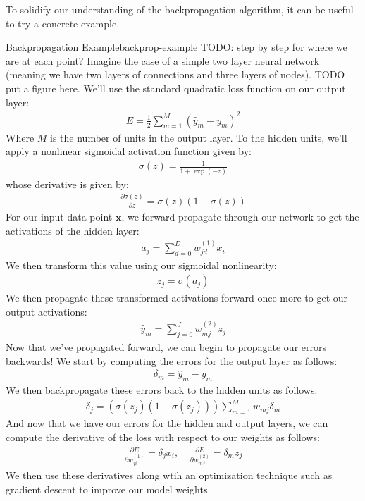 To solidify our understanding of the backpropagation algorithm, it can be useful to try a concrete example.

\begin{example}{Backpropagation Example}{backprop-example}
	TODO: step by step for where we are at each point?
	Imagine the case of a simple two layer neural network (meaning we have two layers of connections and three layers of nodes). TODO put a figure here. We'll use the standard quadratic loss function on our output layer:
	\begin{align*}
		E = \frac{1}{2} \sum_{m=1}^{M} (\hat{y}_{m} - y_{m})^{2}
	\end{align*}
	Where $M$ is the number of units in the output layer. To the hidden units, we'll apply a nonlinear sigmoidal activation function given by:
	\begin{align*}
		\sigma(z) = \frac{1}{1 + \exp{(-z)}}
	\end{align*}
	whose derivative is given by:
	\begin{align*}
		\frac{\partial \sigma(z)}{\partial z} = \sigma(z)(1 - \sigma(z))
	\end{align*}
	For our input data point $\textbf{x}$, we forward propagate through our network to get the activations of the hidden layer:
	\begin{align*}
		a_{j} = \sum_{d=0}^{D} w_{jd}^{(1)} x_{i}
	\end{align*}
	We then transform this value using our sigmoidal nonlinearity:
	\begin{align*}
		z_{j} = \sigma{(a_{j})}
	\end{align*}
	We then propagate these transformed activations forward once more to get our output activations:
	\begin{align*}
		\hat{y}_{m} = \sum_{j=0}^{J} w_{mj}^{(2)} z_{j}
	\end{align*}
	Now that we've propagated forward, we can begin to propagate our errors backwards! We start by computing the errors for the output layer as follows:
	\begin{align*}
		\delta_{m} = \hat{y}_{m} - y_{m}
	\end{align*}
	We then backpropagate these errors back to the hidden units as follows:
	\begin{align*}
		\delta_{j} = (\sigma(z_{j})(1 - \sigma(z_{j}))) \sum_{m=1}^{M} w_{mj} \delta_{m}
	\end{align*}
	And now that we have our errors for the hidden and output layers, we can compute the derivative of the loss with respect to our weights as follows:
	\begin{align*}
		\frac{\partial E}{\partial w_{ji}^{(1)}} = \delta_{j} x_{i}, \quad \frac{\partial E}{\partial w_{mj}^{(2)}} = \delta_{m} z_{j}
	\end{align*}
	We then use these derivatives along wtih an optimization technique such as gradient descent to improve our model weights.
\end{example}

